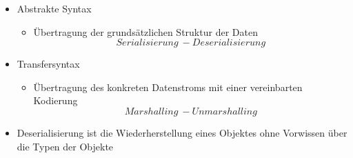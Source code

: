 \begin{itemize}
    \item Abstrakte Syntax
    \begin{itemize}
        \item Übertragung der grundsätzlichen Struktur der Daten \[Serialisierung \:- Deserialisierung\]
    \end{itemize}
    \item Transfersyntax
    \begin{itemize}
        \item Übertragung des konkreten Datenstroms mit einer vereinbarten Kodierung \[Marshalling \:- Unmarshalling\]
    \end{itemize}
\end{itemize}

\begin{itemize}
    \item Deserialisierung ist die Wiederherstellung eines Objektes ohne Vorwissen über die Typen der Objekte
\end{itemize}


